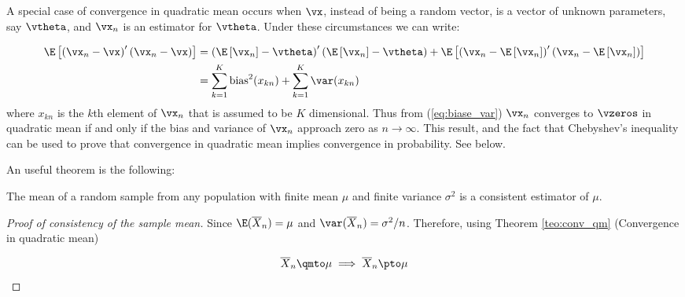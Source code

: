 \documentclass[english,12pt]{book}\usepackage[]{graphicx}\usepackage[]{xcolor}
\begin{document}
A special case of convergence in quadratic mean occurs when $\vx$, instead of being a random vector, is a vector of unknown parameters, say $\vtheta$, and $\vx_n$ is an estimator for $\vtheta$. Under these circumstances we can write:

\begin{equation}\label{eq:biase_var}
  \begin{aligned}
    \E\left[\left(\vx_n  - \vx\right)'\left(\vx_n  - \vx\right)\right] & = \left(\E\left[\vx_n\right]  - \vtheta\right)'\left(\E\left[\vx_n\right]  - \vtheta\right) + \E\left[\left(\vx_n - \E\left[\vx_n\right]\right)'\left(\vx_n - \E\left[\vx_n\right]\right)\right] \\
    & = \sum_{k = 1}^K\mbox{bias}^2(x_{kn}) + \sum_{k = 1}^K \var(x_{kn})
  \end{aligned}
\end{equation}
%
where $x_{kn}$ is the $k$th element of $\vx_n$ that is assumed to be $K$ dimensional. Thus from (\ref{eq:biase_var}) $\vx_n$ converges to $\vzeros$ in quadratic mean if and only if the bias and variance of $\vx_n$ approach zero as $n\to\infty$. This result, and the fact that Chebyshev's inequality can be used to prove that convergence in quadratic mean implies convergence in probability. See below.


An useful theorem is the following:

\begin{theorem}\label{teo:consistency_sample_mean}
The mean of a random sample from any population with finite mean $\mu$ and finite variance $\sigma^2$ is a consistent estimator of $\mu$.
\end{theorem}

\begin{proof}[Proof of consistency of the sample mean]
Since $\E(\overline{X}_n) = \mu$ and $\var(\overline{X}_n) = \sigma^2/n$. Therefore, using Theorem \ref{teo:conv_qm} (Convergence in quadratic mean)

\begin{equation*}
\overline{X}_n \qmto \mu \implies \overline{X}_n \pto \mu
\end{equation*}
\end{proof}
\end{document}
